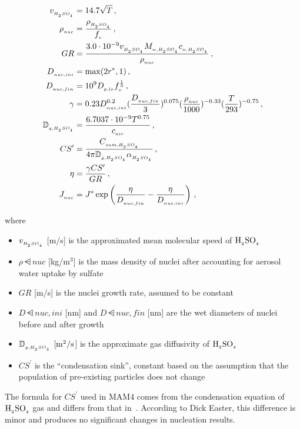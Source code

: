 \begin{align}
  v\dsub{\sag} &= 14.7 \sqrt{T} \,, \\
  \rho\dsub{nuc} &= \frac{\rho\dsub{\sag}}{f\dsub{v}} \,, \\
  GR &= \frac{3.0 \cdot 10^{-9} v\dsub{\sag} \mw{\sag} c\dsub{n,\sag}}
        {\rho\dsub{nuc}} \,, \\
  D\dsub{nuc,ini} &= \max (2r^*, 1) \,, \\
  D\dsub{nuc,fin} &= 10^9 D\dsub{p,lo} f\dsub{v}^{\frac{1}{3}} \,, \\
  \gamma &= 0.23 D\dsub{nuc,int}^{0.2}
                 (\frac{D\dsub{nuc,fin}}{3})^{0.075}
                 (\frac{\rho\dsub{nuc}}{1000})^{-0.33}
                 (\frac{T}{293})^{-0.75} \,, \labeleq{nuc:gamma} \\
  \mathbb{D}\dsub{g,\sag} &= \frac{6.7037 \cdot 10^{-9} T^{0.75}}
                             {c\dsub{air}} \,, \\
  CS^\prime &= \frac{C\dsub{sum,\sag}}
               {4 \pi \mathbb{D}\dsub{g,\sag} \alpha\dsub{\sag}} \,, \label{eq:cs_prime} \\
  \eta &= \frac{\gamma CS^\prime}{GR} \,, \\
  J\dsub{nuc} &= J^* \exp \left( \frac{\eta}{D\dsub{nuc,fin}} -
                     \frac{\eta}{D\dsub{nuc,ini}} \right) \,,
\end{align}

where
\begin{itemize}
  \item $v_{_{H_{_2}SO_{_4}}}$ [m/s] is the approximated mean molecular speed of $\rm H_{_2}SO_{_4}$
  \item $\rho\dsub{nuc}$ [kg/m$^3$] is the mass density of nuclei after
        accounting for aerosol water uptake by sulfate
  \item $GR$ [m/s] is the nuclei growth rate, assumed to be constant
  \item $D\dsub{nuc,ini}$ [nm] and $D\dsub{nuc,fin}$ [nm] are the wet diameters
        of nuclei before and after growth
  \item $\mathbb{D}_{_{g,H_{_2}SO_{_4}}}$ [$\rm m^2/s$] is the approximate gas
        diffusivity of $\rm H_{_2}SO_{_4}$
  \item $CS^\prime$ is the ``condensation sink'', constant based on the
        assumption that the population of pre-existing particles does not
        change
\end{itemize}

The formula for $CS^\prime$ used in MAM4 comes from the condensation equation of
$\rm H_{_2}SO_{_4}$ gas and differs from that in~\cite{kerminen-2002-jas}. According to Dick
Easter, this difference is minor and produces no significant changes in
nucleation results.

